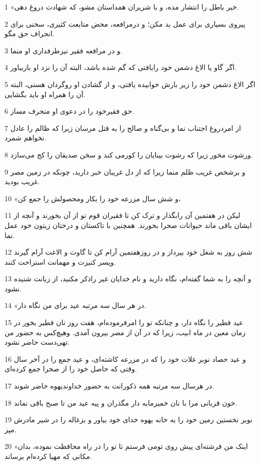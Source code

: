 \par 1 «خبر باطل را انتشار مده، و با شریران همداستان مشو، که شهادت دروغ دهی.
\par 2 پیروی بسیاری برای عمل بد مکن؛ و درمرافعه، محض متابعت کثیری، سخنی برای انحراف حق مگو.
\par 3 و در مرافعه فقیر نیزطرفداری او منما.
\par 4 اگر گاو یا الاغ دشمن خود رایافتی که گم شده باشد، البته آن را نزد او بازبیاور.
\par 5 اگر الاغ دشمن خود را زیر بارش خوابیده یافتی، و از گشادن او روگردان هستی، البته آن را همراه او باید بگشایی.
\par 6 حق فقیرخود را در دعوی او منحرف مساز.
\par 7 از امردروغ اجتناب نما و بی‌گناه و صالح را به قتل مرسان زیرا که ظالم را عادل نخواهم شمرد.
\par 8 ورشوت مخور زیرا که رشوت بینایان را کورمی کند و سخن صدیقان را کج می‌سازد.
\par 9 و برشخص غریب ظلم منما زیرا که از دل غریبان خبر دارید، چونکه در زمین مصر غریب بودید.
\par 10 «و شش سال مزرعه خود را بکار ومحصولش را جمع کن،
\par 11 لیکن در هفتمین آن رابگذار و ترک کن تا فقیران قوم تو از آن بخورند و آنچه از ایشان باقی ماند حیوانات صحرا بخورند. همچنین با تاکستان و درختان زیتون خود عمل نما.
\par 12 شش روز به شغل خود بپرداز و در روزهفتمین آرام کن تا گاوت و الاغت آرام گیرند وپسر کنیزت و مهمانت استراحت کنند.
\par 13 و آنچه را به شما گفته‌ام، نگاه دارید و نام خدایان غیر راذکر مکنید، از زبانت شنیده نشود.
\par 14 «در هر سال سه مرتبه عید برای من نگاه دار.
\par 15 عید فطیر را نگاه دار، و چنانکه تو را امرفرموده‌ام، هفت روز نان فطیر بخور در زمان معین در ماه ابیب، زیرا که در آن از مصر بیرون آمدی. وهیچ‌کس به حضور من تهی‌دست حاضر نشود.
\par 16 و عید حصاد نوبر غلات خود را که در مزرعه کاشته‌ای، و عید جمع را در آخر سال وقتی که حاصل خود را از صحرا جمع کرده‌ای.
\par 17 در هرسال سه مرتبه همه ذکورانت به حضور خداوندیهوه حاضر شوند.
\par 18 خون قربانی مرا با نان خمیرمایه دار مگذران و پیه عید من تا صبح باقی نماند.
\par 19 نوبر نخستین زمین خود را به خانه یهوه خدای خود بیاور و بزغاله را در شیر مادرش مپز.
\par 20 «اینک من فرشته‌ای پیش روی تومی فرستم تا تو را در راه محافظت نموده، بدان مکانی که مهیا کرده‌ام برساند.
